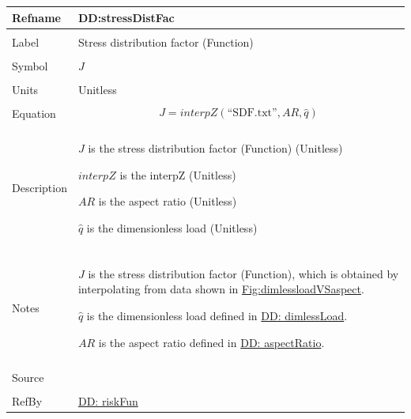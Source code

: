 \documentclass[12pt]{article}
\begin{document}
\noindent \begin{minipage}{\textwidth}
\begin{tabular}{>{\raggedright}p{}>{\raggedright\arraybackslash}p{}}
\toprule \textbf{Refname} & \textbf{DD:stressDistFac}
\label{DD:stressDistFac}
\\ \midrule \\
Label & Stress distribution factor (Function)
        
\\ \midrule \\
Symbol & $J$
         
\\ \midrule \\
Units & Unitless
        
\\ \midrule \\
Equation & \begin{displaymath}
           J=interpZ\left(\text{``SDF.txt''},AR,\hat{q}\right)
           \end{displaymath}
\\ \midrule \\
Description & \begin{symbDescription}
              \item{$J$ is the stress distribution factor (Function) (Unitless)}
              \item{$interpZ$ is the interpZ (Unitless)}
              \item{$AR$ is the aspect ratio (Unitless)}
              \item{$\hat{q}$ is the dimensionless load (Unitless)}
              \end{symbDescription}
\\ \midrule \\
Notes & $J$ is the stress distribution factor (Function), which is obtained by interpolating from data shown in \hyperref[Figure:dimlessloadVSaspect]{Fig:dimlessloadVSaspect}.
        
        $\hat{q}$ is the dimensionless load defined in \hyperref[DD:dimlessLoad]{DD: dimlessLoad}.
        
        $AR$ is the aspect ratio defined in \hyperref[DD:aspectRatio]{DD: aspectRatio}.
        
\\ \midrule \\
Source & \cite{astm2009}
         
\\ \midrule \\
RefBy & \hyperref[DD:riskFun]{DD: riskFun}
        
\\ \bottomrule
\end{tabular}
\end{minipage}
\end{document}
